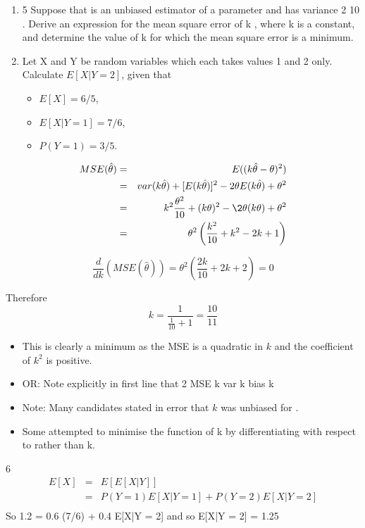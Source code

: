 \documentclass[a4paper,12pt]{article}
\begin{document}
\begin{enumerate}
\item
5 Suppose that is an unbiased estimator of a parameter and has variance
2
10
.
Derive an expression for the mean square error of k , where k is a constant, and
determine the value of k for which the mean square error is a minimum.
\item Let X and Y be random variables which each takes values 1 and 2 only.
Calculate $E[X|Y = 2]$, given that 
\begin{itemize}
\item $E[X] = 6/5$, 
\item $E[X|Y = 1] = 7/6$, 
\item $P(Y = 1) = 3/5$.
\end{itemize}

\end{enumerate}

\begin{eqnarray*}
MSE(  \hat{\theta}) &=& E((  k\hat{\theta} - \theta )^2) \\
&=& var( k\hat{\theta} ) + [E( k\hat{\theta})]^2 -  2\theta E( k \hat{\theta} ) +  \theta^2 \\
&=& k^2 \frac{\theta^2}{10} + (k\theta)^2 - \2 \theta (k \theta) + \theta^2 \\
&=& \theta^2 \left(  \frac{k^2}{10} + k^2 - 2k +1 \right) \\
\end{eqnarray*}

\[\frac{d}{dk} \left(MSE(  \hat{\theta})  \right) =   \theta^2 \left(  \frac{2k}{10} + 2k +2 \right) =0 \]

Therefore
\[k = \frac{1}{\frac{1}{10}+1} = \frac{10}{11}\]


\begin{itemize}
\item This is clearly a minimum as the MSE is a quadratic in $k$ and the coefficient of $k^2$ is
positive.
\item OR: Note explicitly in first line that 2 MSE k var k bias k
\item Note: Many candidates stated in error that $k$ was unbiased for . 
\item Some attempted to minimise the function of k by differentiating with respect to rather than k.
\end{itemize}

6 
\begin{eqnarray*} E[X] &=& E[E[X|Y]] \\ &=& P(Y = 1) E[X|Y = 1] + P(Y = 2) E[X|Y = 2]\\
\end{eqnarray*}
So 1.2 = 0.6 (7/6) + 0.4 E[X|Y = 2] and so E[X|Y = 2] = 1.25
\end{document}
